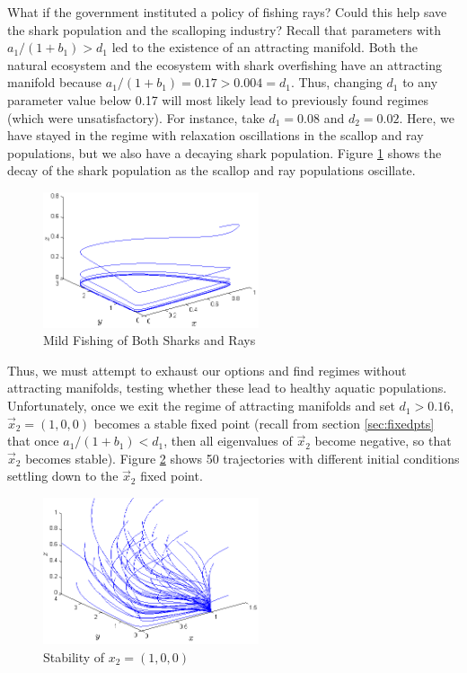 \documentclass[12pt,journal,compsoc,twoside]{IEEEtran}
\begin{document}
What if the government instituted a policy of fishing rays? Could this help save the shark population and the scalloping industry? Recall that parameters with $a_1 / (1 + b_1) > d_1$ led to the existence of an attracting manifold. Both the natural ecosystem and the ecosystem with shark overfishing have an attracting manifold because $a_1 / (1 + b_1) = 0.17 >  0.004 = d_1$. Thus, changing $d_1$ to any parameter value below 0.17 will most likely lead to previously found regimes (which were unsatisfactory). For instance, take $d_1 = 0.08$ and $d_2 = 0.02$. Here, we have stayed in the regime with relaxation oscillations in the scallop and ray populations, but we also have a decaying shark population. Figure \ref{doublefishing} shows the decay of the shark population as the scallop and ray populations oscillate. 
\begin{figure}[h!]
\centering
\includegraphics[width=2.5in]{doublefishing.png}
\caption{Mild Fishing of Both Sharks and Rays}
\label{doublefishing}
\end{figure}

Thus, we must attempt to exhaust our options and find regimes without attracting manifolds, testing whether these lead to healthy aquatic populations. Unfortunately, once we exit the regime of attracting manifolds and set $d_1 > 0.16$, $\vec{x}_2 = (1,0,0)$ becomes a stable fixed point (recall from section \ref{sec:fixedpts} that once $a_1/(1 + b_1) < d_1$, then all eigenvalues of $\vec{x}_2$ become negative, so that $\vec{x}_2$ becomes stable). Figure \ref{stablex2} shows 50 trajectories with different initial conditions settling down to the $\vec{x}_2$ fixed point. 
\begin{figure}[h!]
\centering
\includegraphics[width=2.5in]{stablex2.png}
\caption{Stability of $x_2 = (1,0,0)$}
\label{stablex2}
\end{figure}
\end{document}
